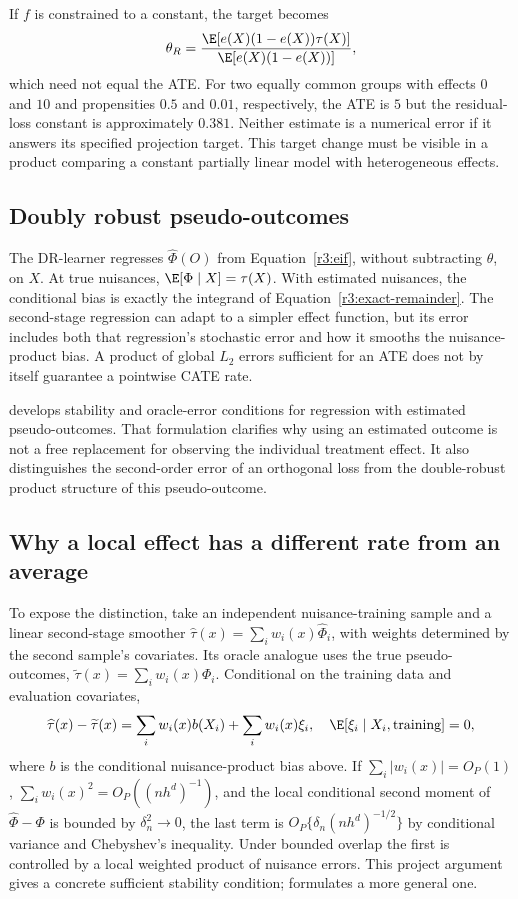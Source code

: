 If $f$ is constrained to a constant, the target becomes
\[
 \theta_R=\frac{\E[e(X)(1-e(X))\tau(X)]}
                 {\E[e(X)(1-e(X))]},
\]
which need not equal the ATE. For two equally common groups with effects
$0$ and $10$ and propensities $0.5$ and $0.01$, respectively, the ATE
is $5$ but the residual-loss constant is approximately $0.381$.
Neither estimate is a numerical error if it answers its specified
projection target. This target change must be visible in a product
comparing a constant partially linear model with heterogeneous effects.

\subsection{Doubly robust pseudo-outcomes}
The DR-learner regresses $\widehat\Phi(O)$ from
Equation~\eqref{r3:eif}, without subtracting $\theta$, on $X$.
At true nuisances, $\E[\Phi\mid X]=\tau(X)$. With estimated nuisances,
the conditional bias is exactly the integrand of
Equation~\eqref{r3:exact-remainder}. The second-stage regression can
adapt to a simpler effect function, but its error includes both that
regression's stochastic error and how it smooths the nuisance-product
bias. A product of global $L_2$ errors sufficient for an ATE does not
by itself guarantee a pointwise CATE rate.

\citet[Sections 3--4]{drlearner2023} develops stability and oracle-error
conditions for regression with estimated pseudo-outcomes. That formulation
clarifies why using an estimated outcome is not a free replacement for
observing the individual treatment effect. It also distinguishes the
second-order error of an orthogonal loss from the double-robust product
structure of this pseudo-outcome.

\subsection{Why a local effect has a different rate from an average}
\label{r3:cate-rates}
To expose the distinction, take an independent nuisance-training sample
and a linear second-stage smoother
$\widehat\tau(x)=\sum_iw_i(x)\widehat\Phi_i$, with weights determined
by the second sample's covariates. Its oracle analogue uses the true
pseudo-outcomes, $\widetilde\tau(x)=\sum_iw_i(x)\Phi_i$.
Conditional on the training data and evaluation covariates,
\[
 \widehat\tau(x)-\widetilde\tau(x)
 =\sum_iw_i(x)b(X_i)+\sum_iw_i(x)\xi_i,
 \quad \E[\xi_i\mid X_i,\text{training}]=0,
\]
where $b$ is the conditional nuisance-product bias above. If
$\sum_i|w_i(x)|=O_P(1)$,
$\sum_iw_i(x)^2=O_P((nh^d)^{-1})$, and the local conditional
second moment of $\widehat\Phi-\Phi$ is bounded by $\delta_n^2\to0$,
the last term is $O_P\{\delta_n(nh^d)^{-1/2}\}$ by conditional
variance and Chebyshev's inequality. Under bounded overlap the first
is controlled by a local weighted product of nuisance errors. This
project argument gives a concrete sufficient stability condition;
\citet[Theorem 2]{drlearner2023} formulates a more general one.

